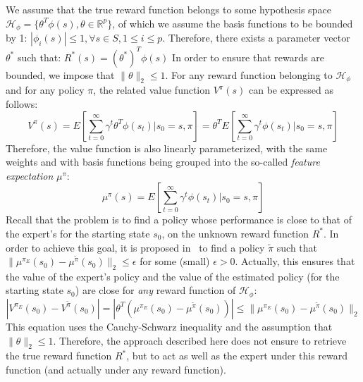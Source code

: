 \documentclass{llncs}
\begin{document}
We assume that the true reward function belongs to some hypothesis
space $\mathcal{H}_\phi = \{\theta^T \phi(s),
\theta\in\mathbb{R}^p\}$, of which we assume the basis functions to
be bounded by 1: $|\phi_i(s)|\leq 1, \forall s\in S, 1\leq i \leq
p$. Therefore, there exists a parameter vector $\theta^*$ such that:
 $R^*(s) = (\theta^*)^T \phi(s)$
In order to ensure that rewards are bounded, we impose that
$\|\theta\|_2\leq 1$. For any reward function belonging to
$\mathcal{H}_\phi$ and for any policy $\pi$, the related value
function $V^\pi(s)$ can be expressed as follows:
\begin{equation}
\scriptstyle
V^\pi(s) = E[\sum\limits_{t=0}^\infty \gamma^t \theta^T \phi(s_t)|s_0=s, \pi] = \theta^T  E[\sum\limits_{t=0}^\infty \gamma^t \phi(s_t)|s_0=s, \pi]
\end{equation}
Therefore, the value function is also linearly parameterized, with
the same weights and with basis functions being grouped into the
so-called \emph{feature expectation} $\mu^\pi$:
\begin{equation}
  \mu^\pi(s) = E[\sum_{t=0}^\infty \gamma^t \phi(s_t)|s_0=s, \pi]
\end{equation}
Recall that the problem is to find a policy whose performance is
close to that of the expert's for the starting state $s_0$, on the
unknown reward function $R^*$. In order to achieve this goal, it is
proposed in~\citep{abbeel2004apprenticeship} to find a policy $\tilde{\pi}$ such
that $\|\mu^{\pi_E}(s_0)-\mu^{\tilde{\pi}}(s_0)\|_2\leq \epsilon$
for some (small) $\epsilon>0$. Actually, this ensures that the value
of the expert's policy and the value of the estimated policy (for
the starting state $s_0$) are close for \emph{any} reward function
of $\mathcal{H}_\phi$:
\begin{equation}
\scriptstyle
  |V^{\pi_E}(s_0) - V^{\tilde{\pi}}(s_0)| =
  |\theta^T(\mu^{\pi_E}(s_0)-\mu^{\tilde{\pi}}(s_0))|
  \leq \|\mu^{\pi_E}(s_0)-\mu^{\tilde{\pi}}(s_0)\|_2
\label{eqn:vs0}
\end{equation}
This equation uses the Cauchy-Schwarz inequality and the
assumption that $\|\theta\|_2\leq 1$. Therefore, the approach
described here does not ensure to retrieve the true reward function
$R^*$, but to act as well as the expert under this reward function
(and actually under any reward function).
\end{document}
